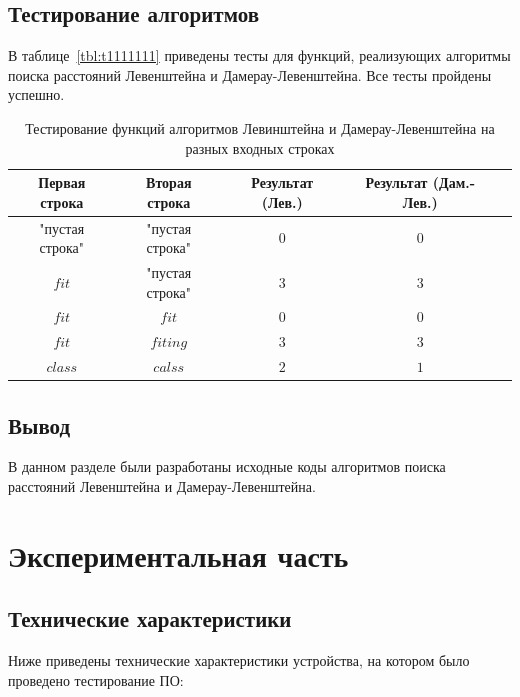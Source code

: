 \documentclass[12pt]{report}
\begin{document}
	\section{Тестирование алгоритмов}

	В таблице~\ref{tbl:t1111111} приведены тесты для функций, реализующих алгоритмы поиска расстояний Левенштейна и Дамерау-Левенштейна. Все тесты пройдены успешно.\newline\newline
	
	\begin{table} [H]
		\caption{Тестирование функций алгоритмов Левинштейна и Дамерау-Левенштейна на разных входных строках}
		\center
		\label{table:t1111111}
			\begin{tabular}{|c | c | c | c | c|}
				
				\hline
				Первая строка & Вторая строка & Результат (Лев.) & Результат (Дам.-Лев.) \\ 
				\hline
				"пустая строка" & "пустая строка" & $0$ & $0$\\\hline
				$fit$  & "пустая строка" & $3$ & $3$\\\hline
				$fit$  & $fit$  & $0$ & $0$\\\hline
				$fit$  & $fiting$  & $3$ & $3$\\\hline
				$class$ & $calss$ & $2$ & $1$\\\hline
				
			\end{tabular}
	\end{table}


	\section*{Вывод}
	
	В данном разделе были разработаны исходные коды алгоритмов поиска расстояний Левенштейна и Дамерау-Левенштейна.
	
	\chapter{Экспериментальная часть}
	
	\section{Технические характеристики}
	
	Ниже приведены технические характеристики устройства, на котором было проведено тестирование ПО:
	
\end{document}

